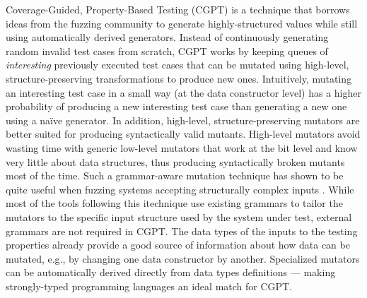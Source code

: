 \documentclass[sigconf, anonymous, review]{acmart}
\newcommand{\quickcheck}{\textit{QuickCheck}\xspace}
\newcommand{\quickchick}{\textit{QuickChick}\xspace}
\newcommand{\fuzzchick}{\textit{FuzzChick}\xspace}
\begin{document}
%
Coverage-Guided, Property-Based Testing (CGPT) \cite{lampropoulos2019coverage}
is a technique that borrows ideas from the fuzzing community to generate
highly-structured values while still using automatically derived generators.
%
%
Instead of continuously generating random invalid test cases from scratch, CGPT
works by keeping queues of \emph{interesting} previously executed test cases
that can be mutated using high-level, structure-preserving transformations to
produce new ones.
%
%
Intuitively, mutating an interesting test case in a small way (at the data
constructor level) has a higher probability of producing a new interesting test
case than generating a new one using a na\"ive generator.
%
In addition, high-level, structure-preserving mutators are better suited for
producing syntactically valid mutants.
%
High-level mutators avoid wasting time with generic low-level mutators that work
at the bit level and know very little about data structures, thus producing
syntactically broken mutants most of the time.
%
Such a grammar-aware mutation technique has shown to be quite useful when
fuzzing systems accepting structurally complex inputs \cite{holler2012fuzzing,
  wang2019superion, xsmith}.
%
While most of the tools following this itechnique use existing grammars to
tailor the mutators to the specific input structure used by the system under
test, external grammars are not required in CGPT.
%
%
%
The data types of the inputs to the testing properties already provide a good source
of information about how data can be mutated, e.g., by changing one data constructor
by another.
%
Specialized mutators can be automatically derived directly from data types
definitions --- making strongly-typed programming languages an ideal match for
CGPT.
\end{document}
